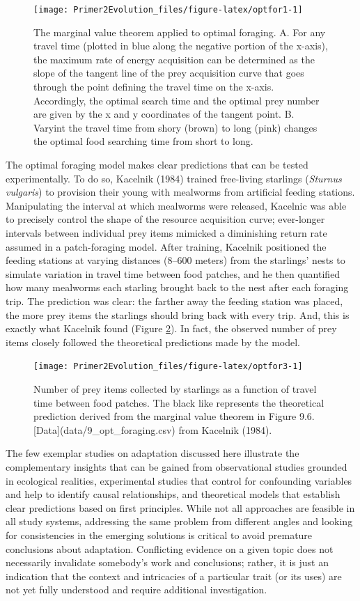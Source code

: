 \documentclass[
]{book}
\begin{document}
\begin{figure}
\texttt{[image: Primer2Evolution\_files/figure-latex/optfor1-1]} \caption{The marginal value theorem applied to optimal foraging. A. For any travel time (plotted in blue along the negative portion of the x-axis), the maximum rate of energy acquisition can be determined as the slope of the tangent line of the prey acquisition curve that goes through the point defining the travel time on the x-axis. Accordingly, the optimal search time and the optimal prey number are given by the x and y coordinates of the tangent point. B. Varyint the travel time from shory (brown) to long (pink) changes the optimal food searching time from short to long. }\label{fig:optfor1}
\end{figure}

The optimal foraging model makes clear predictions that can be tested experimentally. To do so, Kacelnik (1984) trained free-living starlings (\emph{Sturnus vulgaris}) to provision their young with mealworms from artificial feeding stations. Manipulating the interval at which mealworms were released, Kacelnic was able to precisely control the shape of the resource acquisition curve; ever-longer intervals between individual prey items mimicked a diminishing return rate assumed in a patch-foraging model. After training, Kacelnik positioned the feeding stations at varying distances (8--600 meters) from the starlings' nests to simulate variation in travel time between food patches, and he then quantified how many mealworms each starling brought back to the nest after each foraging trip. The prediction was clear: the farther away the feeding station was placed, the more prey items the starlings should bring back with every trip. And, this is exactly what Kacelnik found (Figure \ref{fig:optfor3}). In fact, the observed number of prey items closely followed the theoretical predictions made by the model.

\begin{figure}
\texttt{[image: Primer2Evolution\_files/figure-latex/optfor3-1]} \caption{Number of prey items collected by starlings as a function of travel time between food patches. The black like represents the theoretical prediction derived from the marginal value theorem in Figure 9.6. [Data](data/9_opt_foraging.csv) from Kacelnik (1984).}\label{fig:optfor3}
\end{figure}

The few exemplar studies on adaptation discussed here illustrate the complementary insights that can be gained from observational studies grounded in ecological realities, experimental studies that control for confounding variables and help to identify causal relationships, and theoretical models that establish clear predictions based on first principles. While not all approaches are feasible in all study systems, addressing the same problem from different angles and looking for consistencies in the emerging solutions is critical to avoid premature conclusions about adaptation. Conflicting evidence on a given topic does not necessarily invalidate somebody's work and conclusions; rather, it is just an indication that the context and intricacies of a particular trait (or its uses) are not yet fully understood and require additional investigation.
\end{document}
